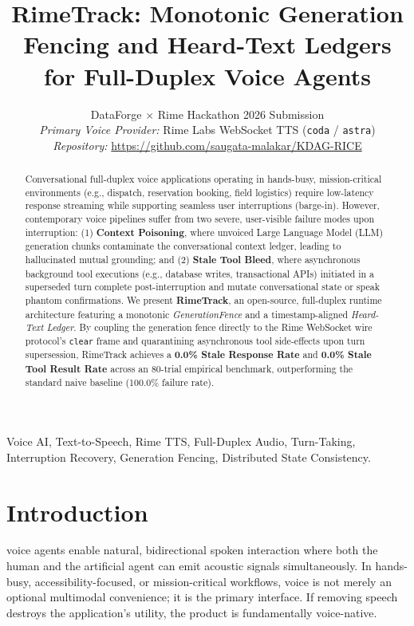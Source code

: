 \documentclass[10pt,journal,compsoc]{IEEEtran}
\theoremstyle{definition}
\begin{document}
\title{RimeTrack: Monotonic Generation Fencing and Heard-Text Ledgers for Full-Duplex Voice Agents}

\author{DataForge $\times$ Rime Hackathon 2026 Submission\\
\textit{Primary Voice Provider:} Rime Labs WebSocket TTS (\texttt{coda} / \texttt{astra})\\
\textit{Repository:} \url{https://github.com/saugata-malakar/KDAG-RICE}
}

\maketitle

\begin{abstract}
Conversational full-duplex voice applications operating in hands-busy, mission-critical environments (e.g., dispatch, reservation booking, field logistics) require low-latency response streaming while supporting seamless user interruptions (barge-in). However, contemporary voice pipelines suffer from two severe, user-visible failure modes upon interruption: (1) \textbf{Context Poisoning}, where unvoiced Large Language Model (LLM) generation chunks contaminate the conversational context ledger, leading to hallucinated mutual grounding; and (2) \textbf{Stale Tool Bleed}, where asynchronous background tool executions (e.g., database writes, transactional APIs) initiated in a superseded turn complete post-interruption and mutate conversational state or speak phantom confirmations. We present \textbf{RimeTrack}, an open-source, full-duplex runtime architecture featuring a monotonic \textit{GenerationFence} and a timestamp-aligned \textit{Heard-Text Ledger}. By coupling the generation fence directly to the Rime WebSocket wire protocol's \texttt{clear} frame and quarantining asynchronous tool side-effects upon turn supersession, RimeTrack achieves a \textbf{0.0\% Stale Response Rate} and \textbf{0.0\% Stale Tool Result Rate} across an 80-trial empirical benchmark, outperforming the standard naive baseline (100.0\% failure rate).
\end{abstract}

\begin{IEEEkeywords}
Voice AI, Text-to-Speech, Rime TTS, Full-Duplex Audio, Turn-Taking, Interruption Recovery, Generation Fencing, Distributed State Consistency.
\end{IEEEkeywords}

\section{Introduction}
 voice agents enable natural, bidirectional spoken interaction where both the human and the artificial agent can emit acoustic signals simultaneously. In hands-busy, accessibility-focused, or mission-critical workflows, voice is not merely an optional multimodal convenience; it is the primary interface. If removing speech destroys the application's utility, the product is fundamentally voice-native.
\end{document}
